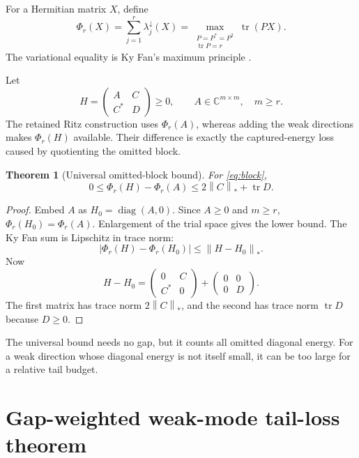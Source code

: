 \documentclass[11pt]{article}
\newtheorem{theorem}{Theorem}[section]
\theoremstyle{definition}
\theoremstyle{remark}
\newcommand{\norm}[1]{\left\lVert#1\right\rVert}
\newcommand{\tr}{\operatorname{tr}}
\begin{document}
For a Hermitian matrix $X$, define
\[
 \Phi_r(X)=\sum_{j=1}^r\lambda_j^\downarrow(X)
 =\max_{\substack{P=P^*=P^2\\\tr P=r}}\tr(PX).
\]
The variational equality is Ky Fan's maximum principle
\citep{Fan1949,Bhatia1997}.

Let
\begin{equation}
 H=\begin{pmatrix}A&C\\C^*&D\end{pmatrix}\ge0,
 \qquad A\in\mathbb C^{m\times m},\quad m\ge r.
 \label{eq:block}
\end{equation}
The retained Ritz construction uses $\Phi_r(A)$, whereas adding the weak
directions makes $\Phi_r(H)$ available.  Their difference is exactly the
captured-energy loss caused by quotienting the omitted block.

\begin{theorem}[Universal omitted-block bound]
\label{thm:universal}
For \eqref{eq:block},
\begin{equation}
 0\le\Phi_r(H)-\Phi_r(A)
 \le 2\norm C_*+\tr D.
 \label{eq:universal}
\end{equation}
\end{theorem}

\begin{proof}
Embed $A$ as $H_0=\operatorname{diag}(A,0)$.  Since $A\ge0$ and $m\ge r$,
$\Phi_r(H_0)=\Phi_r(A)$.  Enlargement of the trial space gives the lower
bound.  The Ky Fan sum is Lipschitz in trace norm:
\[
 |\Phi_r(H)-\Phi_r(H_0)|\le\norm{H-H_0}_*.
\]
Now
\[
 H-H_0=
 \begin{pmatrix}0&C\\C^*&0\end{pmatrix}
 +\begin{pmatrix}0&0\\0&D\end{pmatrix}.
\]
The first matrix has trace norm $2\norm C_*$, and the second has trace norm
$\tr D$ because $D\ge0$.
\end{proof}

The universal bound needs no gap, but it counts all omitted diagonal energy.
For a weak direction whose diagonal energy is not itself small, it can be too
large for a relative tail budget.

\section{Gap-weighted weak-mode tail-loss theorem}
\label{sec:gap}
\end{document}
